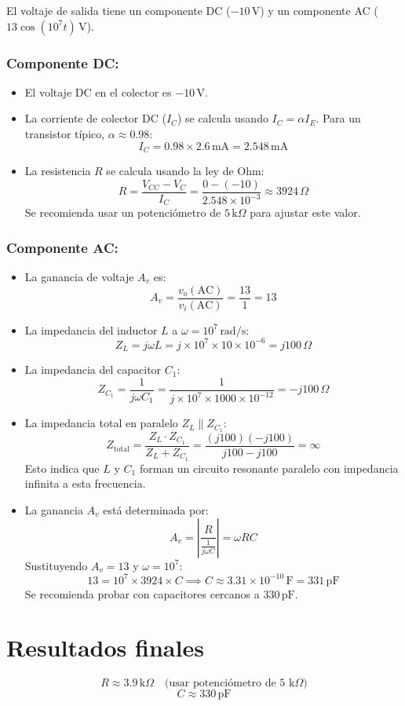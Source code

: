 El voltaje de salida tiene un componente DC (\( -10 \, \text{V} \)) y un componente AC (\( 13 \cos(10^7 t) \, \text{V} \)).

\subsubsection*{Componente DC:}
\begin{itemize}
    \item El voltaje DC en el colector es \( -10 \, \text{V} \).
    \item La corriente de colector DC (\( I_C \)) se calcula usando \( I_C = \alpha I_E \). Para un transistor típico, \( \alpha \approx 0.98 \):
    \[
    I_C = 0.98 \times 2.6 \, \text{mA} = 2.548 \, \text{mA}
    \]
    \item La resistencia \( R \) se calcula usando la ley de Ohm:
    \[
    R = \frac{V_{CC} - V_{C}}{I_C} = \frac{0 - (-10)}{2.548 \times 10^{-3}} \approx 3924 \, \Omega
    \]
    Se recomienda usar un potenciómetro de \( 5 \, \text{k}\Omega \) para ajustar este valor.
\end{itemize}

\subsubsection*{Componente AC:}
\begin{itemize}
    \item La ganancia de voltaje \( A_v \) es:
    \[
    A_v = \frac{v_o(\text{AC})}{v_i(\text{AC})} = \frac{13}{1} = 13
    \]
    \item La impedancia del inductor \( L \) a \( \omega = 10^7 \, \text{rad/s} \):
    \[
    Z_L = j\omega L = j \times 10^7 \times 10 \times 10^{-6} = j100 \, \Omega
    \]
    \item La impedancia del capacitor \( C_1 \):
    \[
    Z_{C_1} = \frac{1}{j\omega C_1} = \frac{1}{j \times 10^7 \times 1000 \times 10^{-12}} = -j100 \, \Omega
    \]
    \item La impedancia total en paralelo \( Z_{L} \parallel Z_{C_1} \):
    \[
    Z_{\text{total}} = \frac{Z_L \cdot Z_{C_1}}{Z_L + Z_{C_1}} = \frac{(j100)(-j100)}{j100 - j100} = \infty
    \]
    Esto indica que \( L \) y \( C_1 \) forman un circuito resonante paralelo con impedancia infinita a esta frecuencia.
    \item La ganancia \( A_v \) está determinada por:
    \[
    A_v = \left| \frac{R}{\frac{1}{j\omega C}} \right| = \omega R C
    \]
    Sustituyendo \( A_v = 13 \) y \( \omega = 10^7 \):
    \[
    13 = 10^7 \times 3924 \times C \implies C \approx 3.31 \times 10^{-10} \, \text{F} = 331 \, \text{pF}
    \]
    Se recomienda probar con capacitores cercanos a \( 330 \, \text{pF} \).
\end{itemize}

\section*{Resultados finales}
\[
\boxed{R \approx 3.9 \, \text{k}\Omega \quad \text{(usar potenciómetro de 5 k}\Omega\text{)}}
\]
\[
\boxed{C \approx 330 \, \text{pF}}
\]
